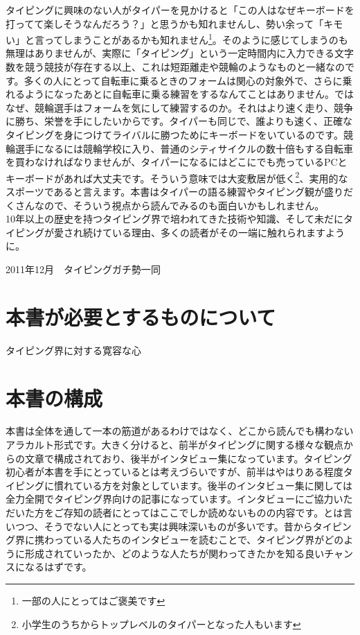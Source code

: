 タイピングに興味のない人がタイパーを見かけると「この人はなぜキーボードを打ってて楽しそうなんだろう？」と思うかも知れませんし、勢い余って「キモい」と言ってしまうことがあるかも知れません\footnote{一部の人にとってはご褒美です}。そのように感じてしまうのも無理はありませんが、実際に「タイピング」という一定時間内に入力できる文字数を競う競技が存在する以上、これは短距離走や競輪のようなものと一緒なのです。多くの人にとって自転車に乗るときのフォームは関心の対象外で、さらに乗れるようになったあとに自転車に乗る練習をするなんてことはありません。ではなぜ、競輪選手はフォームを気にして練習するのか。それはより速く走り、競争に勝ち、栄誉を手にしたいからです。タイパーも同じで、誰よりも速く、正確なタイピングを身につけてライバルに勝つためにキーボードをいているのです。競輪選手になるには競輪学校に入り、普通のシティサイクルの数十倍もする自転車を買わなければなりませんが、タイパーになるにはどこにでも売っているPCとキーボードがあれば大丈夫です。そういう意味では大変敷居が低く\footnote{小学生のうちからトップレベルのタイパーとなった人もいます}、実用的なスポーツであると言えます。本書はタイパーの語る練習やタイピング観が盛りだくさんなので、そういう視点から読んでみるのも面白いかもしれません。\\

10年以上の歴史を持つタイピング界で培われてきた技術や知識、そして未だにタイピングが愛され続けている理由、多くの読者がその一端に触れられますように。

\begin{flushright}
2011年12月　タイピングガチ勢一同
\end{flushright}

\part*{本書が必要とするものについて}
タイピング界に対する寛容な心

\part*{本書の構成}
本書は全体を通して一本の筋道があるわけではなく、どこから読んでも構わないアラカルト形式です。大きく分けると、前半がタイピングに関する様々な観点からの文章で構成されており、後半がインタビュー集になっています。タイピング初心者が本書を手にとっているとは考えづらいですが、前半はやはりある程度タイピングに慣れている方を対象としています。後半のインタビュー集に関しては全力全開でタイピング界向けの記事になっています。インタビューにご協力いただいた方をご存知の読者にとってはここでしか読めないものの内容です。とは言いつつ、そうでない人にとっても実は興味深いものが多いです。昔からタイピング界に携わっている人たちのインタビューを読むことで、タイピング界がどのように形成されていったか、どのような人たちが関わってきたかを知る良いチャンスになるはずです。

